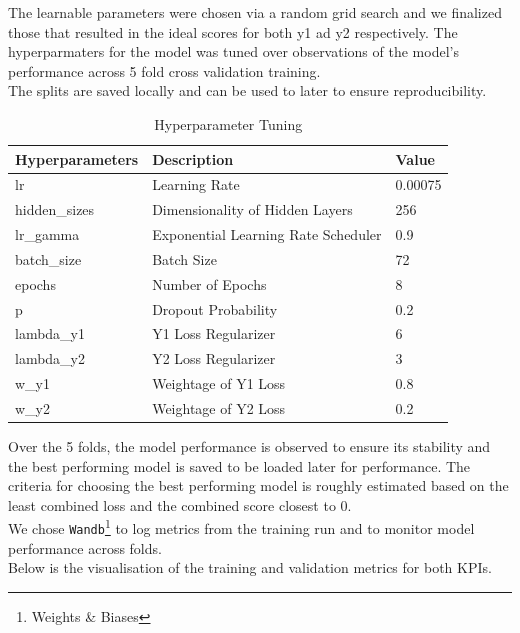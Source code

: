 \documentclass{report} %
\begin{document}
The learnable parameters were chosen via a random grid search and we finalized those that resulted in the ideal scores for both y1 ad y2 respectively.
The hyperparmaters for the model was tuned over observations of the model's performance across 5 fold cross validation training.\\
The splits are saved locally and can be used to later to ensure reproducibility.

\begin{table}[H]
    \centering
    \begin{tabularx}{1\linewidth}{|X|X|X|}
    \hline {\bf Hyperparameters} & {\bf Description} & {\bf Value}\\
    \hline 
    lr & Learning Rate & 0.00075 \\
    hidden\_sizes & Dimensionality of Hidden Layers& 256 \\
    lr\_gamma & Exponential Learning Rate Scheduler & 0.9 \\
    batch\_size & Batch Size & 72 \\
    epochs & Number of Epochs & 8 \\
    p & Dropout Probability& 0.2 \\
    lambda\_y1 & Y1 Loss Regularizer & 6 \\
    lambda\_y2 & Y2 Loss Regularizer & 3 \\
    w\_y1 & Weightage of Y1 Loss & 0.8 \\
    w\_y2 & Weightage of Y2 Loss & 0.2 \\
    \hline
    \end{tabularx}
    \caption{Hyperparameter Tuning}
    \label{tab:Hyperparameter Tunings}
\end{table}

Over the 5 folds, the model performance is observed to ensure its stability and the best performing model is saved to be loaded later for performance.
The criteria for choosing the best performing model is roughly estimated based on the least combined loss and the combined score closest to 0.\\
We chose \texttt{Wandb}\footnote{Weights \& Biases} to log metrics from the training run and to monitor model performance across folds. \\
Below is the visualisation of the training and validation metrics for both \ac{KPI}s.\\
\end{document}
